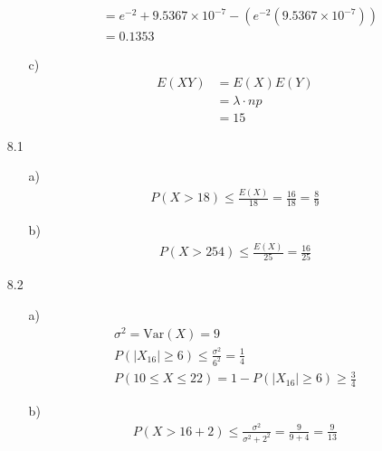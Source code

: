 \documentclass{article}
\begin{document}
\begin{itemize}
\begin{itemize}
\begin{align*}
            &=e^{-2}+9.5367\times 10^{-7}-\left(e^{-2}\left(9.5367\times 10^{-7}\right)\right)\\
            &=0.1353
        \end{align*}
        \item [c)]
        \begin{align*}
            E(XY)&=E(X)E(Y)\\
            &=\lambda\cdot np\\
            &=15
        \end{align*}
    \end{itemize}
    \item [8.1]
    \begin{itemize}
        \item [a)]
        \begin{align*}
            P(X>18)\leq \frac{E(X)}{18}=\frac{16}{18}=\frac{8}{9}
        \end{align*}
        \item [b)]
        \begin{align*}
            P(X>254)\leq \frac{E(X)}{25}=\frac{16}{25}
        \end{align*}
    \end{itemize}
    \item [8.2]
    \begin{itemize}
        \item [a)]
        \begin{align*}
            \sigma^2=\text{Var}(X)=9\\
            P(|X_16|\geq 6)\leq \frac{\sigma^2}{6^2}=\frac{1}{4}\\
            P(10\leq X\leq22)=1-P(|X_16|\geq 6)\geq \frac{3}{4}
        \end{align*}
        \item [b)]
        \begin{align*}
            P(X>16+2)\leq \frac{\sigma^2}{\sigma^2+2^2}=\frac{9}{9+4}=\frac{9}{13}
        \end{align*}
    \end{itemize}
\end{itemize}
\end{document}
